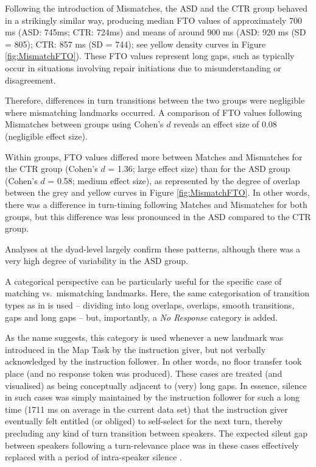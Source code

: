 Following the introduction of Mismatches, the ASD and the CTR group behaved in a strikingly similar way, producing median FTO values of approximately 700 ms (ASD: 745ms; CTR: 724ms) and means of around 900 ms (ASD: 920 ms (SD = 805); CTR: 857 ms (SD = 744); see yellow density curves in Figure \ref{fig:MismatchFTO}). These FTO values represent long gaps, such as typically occur in situations involving repair initiations due to misunderstanding or disagreement.

Therefore, differences in turn transitions between the two groups were negligible where mismatching landmarks occurred. A comparison of FTO values following Mismatches between groups using Cohen's \(d\) reveals an effect size of 0.08 (negligible effect size).

Within groups, FTO values differed more between Matches and Mismatches for the CTR group (Cohen's \(d\) = 1.36; large effect size) than for the ASD group (Cohen's \(d\) = 0.58; medium effect size), as represented by the degree of overlap between the grey and yellow curves in Figure \ref{fig:MismatchFTO}. In other words, there was a difference in turn-timing following Matches and Mismatches for both groups, but this difference was less pronounced in the ASD compared to the CTR group.

Analyses at the dyad-level largely confirm these patterns, although there was a very high degree of variability in the ASD group.

\label{turntaking_results_mismatches_results_categorical}

A categorical perspective can be particularly useful for the specific case of matching vs.~mismatching landmarks. Here, the same categorisation of transition types as in  is used -- dividing into long overlaps, overlaps, smooth transitions, gaps and long gaps -- but, importantly, a \textit{No Response} category is added.

As the name suggests, this category is used whenever a new landmark was introduced in the Map Task by the instruction giver, but not verbally acknowledged by the instruction follower. In other words, no floor transfer took place (and no response token was produced). These cases are treated (and visualised) as being conceptually adjacent to (very) long gaps. In essence, silence in such cases was simply maintained by the instruction follower for such a long time (1711 ms on average in the current data set) that the instruction giver eventually felt entitled (or obliged) to self-select for the next turn, thereby precluding any kind of turn transition between speakers. The expected silent gap between speakers following a turn-relevance place was in these cases effectively replaced with a period of intra-speaker silence \citep[cf.][]{sacksSimplestSystematicsOrganization1978}.

